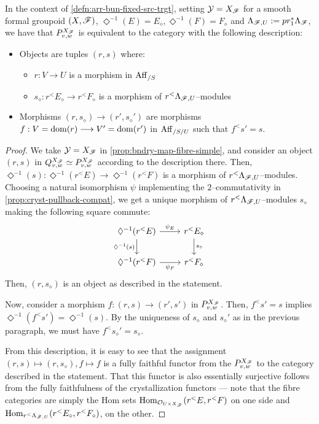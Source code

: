 \documentclass[11pt]{amsart}
\begin{document}
\begin{prop}
In the context of \cref{defn:arr-bun-fixed-src-trgt}, setting $\mathcal{Y} = X_\mathscr{F}$ for
a smooth formal groupoid $(X, \mathscr{F})$,
$\Diamond^{-1}(E) = E_\diamond, \Diamond^{-1}(F) = F_\diamond$ and
$\Lambda_{\mathscr{F}, U} := pr_1^*\Lambda_{\mathscr{F}}$, we have that $P^{X_\mathscr{F}}_{v, w}$
is equivalent to the category with the following description:
\begin{itemize}
\item Objects are tuples $(r, s)$ where:
\begin{itemize}
\item $r : V \to U$ is a morphism in $\mathrm{Aff}_{/S}$
\item $s_\diamond : r^<E_\diamond \to r^<F_\diamond$ is a morphism of
$r^<\Lambda_{\mathscr{F}, U}$--modules
\end{itemize}
\item Morphisms $(r, s_\diamond) \to (r', s_\diamond')$ are morphisms
$f : V = \dom(r) \to V' = \dom(r')$ in $\mathrm{Aff}_{/S/U}$ such that
$f^<s' = s$.
\end{itemize}
\end{prop}
\begin{proof}
We take $\mathcal{Y} = X_\mathscr{F}$ in \cref{prop:bndry-map-fibre-simple}, and consider
an object $(r, s)$ in $Q^{X_\mathscr{F}}_{v, w} \simeq P^{X_\mathscr{F}}_{v, w}$ according to
the description there. Then,
$\Diamond^{-1}(s) : \Diamond^{-1}(r^<E) \to \Diamond^{-1}(r^<F)$ is a
morphism of $r^<\Lambda_{\mathscr{F}, U}$--modules. Choosing a natural
isomorphism $\psi$ implementing the $2$--commutativity in
\cref{prop:cryst-pullback-compat}, we get a unique morphism of
$r^<\Lambda_{\mathscr{F}, U}$--modules $s_\diamond$ making the following square commute:
\[\begin{tikzcd}
\Diamond^{-1}(r^<E) \ar[r, "\psi_{E}"] \ar[d, "\Diamond^{-1}(s)" left] &
r^<E_\diamond \ar[d, "s_\diamond"] \\
\Diamond^{-1}(r^<F) \ar[r, "\psi_{F}" below] &
r^<F_\diamond
\end{tikzcd}\]
Then, $(r, s_\diamond)$ is an object as described in the statement.

Now, consider a morphism $f : (r, s) \to (r', s')$ in $P^{X_\mathscr{F}}_{v, w}$.
Then, $f^<s' = s$ implies $\Diamond^{-1}(f^<s') = \Diamond^{-1}(s)$.
By the uniqueness of $s_\diamond$ and $s_\diamond'$ as in the previous paragraph,
we must have $f^<s_\diamond' = s_\diamond$.

From this description, it is easy to see that the assignment
$(r, s) \mapsto (r, s_\diamond), f \mapsto f$ is a fully faithful functor
from the $P^{X_\mathscr{F}}_{v, w}$ to the category described in the statement.
That this functor is also essentially surjective follows from the
fully faithfulness of the crystallization functors --- note that the fibre
categories are simply the Hom sets $\mathrm{Hom}_{\mathcal{O}_{U \times X_\mathscr{F}}}(r^<E, r^<F)$
on one side and $\mathrm{Hom}_{r^<\Lambda_{\mathscr{F}, U}}(r^<E_\diamond, r^<F_\diamond)$,
on the other.
\end{proof}
\end{document}
